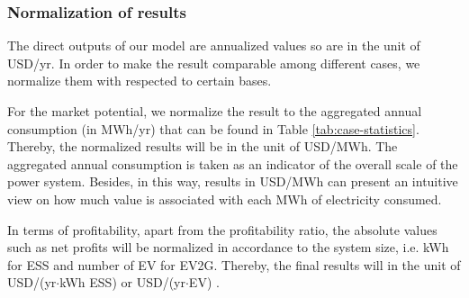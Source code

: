 \subsubsection{Normalization of results}

The direct outputs of our model are annualized values so are in the unit of USD/yr. In order to make the result comparable among different cases, we normalize them with respected to certain bases.

For the market potential, we normalize the result to the aggregated annual consumption (in MWh/yr) that can be found in Table \ref{tab:case-statistics}. Thereby, the normalized results will be in the unit of USD/MWh. The aggregated annual consumption is taken as an indicator of the overall scale of the power system. Besides, in this way, results in USD/MWh can present an intuitive view on how much value is associated with each MWh of electricity consumed. 

In terms of profitability, apart from the profitability ratio, the absolute values such as net profits will be normalized in accordance to the system size, i.e. kWh for ESS and number of EV for EV2G. Thereby, the final results will in the unit of USD/(yr$\cdot$kWh ESS) or USD/(yr$\cdot$EV) .





